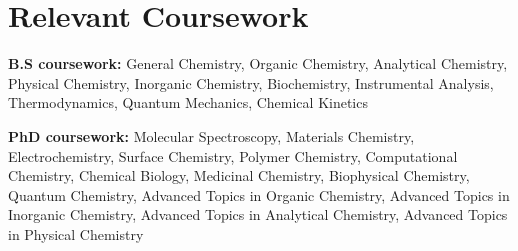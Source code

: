 \documentclass[letterpaper,11pt]{article}
\makeatletter
\newcommand{\resumeOrganizationHeading}[4]{
	\vspace{-2pt}\item
	\begin{tabular*}{0.97\textwidth}[t]{l@{\extracolsep{\fill}}r}
		\textbf{#1} & \textit{\small #2} \\
		\textit{\small#3}
	\end{tabular*}\vspace{-7pt}
}
\newcommand{\resumeSubHeadingListStart}{\begin{itemize}[leftmargin=0.15in, label={}]}
\newcommand{\resumeSubHeadingListEnd}{\end{itemize}}
\makeatother
\begin{document}
	
	
	
	\section{Relevant Coursework}
	\vspace{2pt}
	\resumeSubHeadingListStart
	\small{\item{
			\textbf{B.S coursework:}{ 
				General Chemistry,
				Organic Chemistry,
				Analytical Chemistry,
				Physical Chemistry,
				Inorganic Chemistry,
				Biochemistry,
				Instrumental Analysis,
				Thermodynamics,
				Quantum Mechanics,
				Chemical Kinetics} \\ \vspace{3pt}
			
			\textbf{PhD coursework:}{
				Molecular Spectroscopy,
				Materials Chemistry,
				Electrochemistry,
				Surface Chemistry,
				Polymer Chemistry,
				Computational Chemistry,
				Chemical Biology,
				Medicinal Chemistry,
				Biophysical Chemistry,
				Quantum Chemistry,
				Advanced Topics in Organic Chemistry,
				Advanced Topics in Inorganic Chemistry,
				Advanced Topics in Analytical Chemistry,
				Advanced Topics in Physical Chemistry} \\ \vspace{3pt}
			
	}}
	\resumeSubHeadingListEnd
	
	
	
	
	
	
	
	
	
	
	
	
\end{document}
